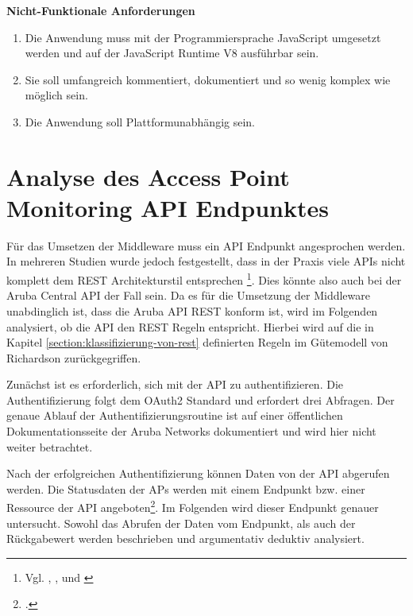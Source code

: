 \textbf{Nicht-Funktionale Anforderungen}

\begin{enumerate}
    \item Die Anwendung muss mit der Programmiersprache JavaScript umgesetzt werden und auf der JavaScript Runtime V8 ausführbar sein.
    \item Sie soll umfangreich kommentiert, dokumentiert und so wenig komplex wie möglich sein.
    \item Die Anwendung soll Plattformunabhängig sein.
    
\end{enumerate}

\section{Analyse des Access Point Monitoring API Endpunktes}\label{section:analyse-des-access-point-monitoring-endpunkte}

Für das Umsetzen der Middleware muss ein API Endpunkt angesprochen werden. In mehreren Studien wurde jedoch festgestellt, dass in der Praxis viele APIs nicht komplett dem REST Architekturstil entsprechen \footnote{Vgl. \cite[S. 243]{franch_detection_2014}, \cite[S. 185]{palma_semantic_2017}, \cite[S. 11f]{presutti_restful_2014} und \cite[S. 38]{rodriguez_restful_2008}}. Dies könnte also auch bei der Aruba Central API der Fall sein. Da es für die Umsetzung der Middleware unabdinglich ist, dass die Aruba API REST konform ist, wird im Folgenden analysiert, ob die API den REST Regeln entspricht. Hierbei wird auf die in Kapitel \ref{section:klassifizierung-von-rest} definierten Regeln im Gütemodell von Richardson zurückgegriffen.

Zunächst ist es erforderlich, sich mit der API zu authentifizieren. Die Authentifizierung folgt dem OAuth2 Standard\cite{parecki_oauth_2021} und erfordert drei Abfragen. Der genaue Ablauf der Authentifizierungsroutine ist auf einer öffentlichen Dokumentationsseite der Aruba Networks dokumentiert\cite{hewlett_packard_enterprise_development_lp_oauth_2021} und wird hier nicht weiter betrachtet.

Nach der erfolgreichen Authentifizierung können Daten von der API abgerufen werden. Die Statusdaten der APs werden mit einem Endpunkt bzw. einer Ressource der API angeboten\footcite{hewlett_packard_enterprise_development_lp_aruba_2021-1}. Im Folgenden wird dieser Endpunkt genauer untersucht. Sowohl das Abrufen der Daten vom Endpunkt, als auch der Rückgabewert werden beschrieben und argumentativ deduktiv analysiert. 

